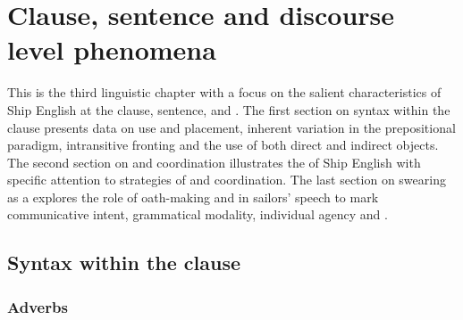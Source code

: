 \chapter{{Clause, sentence and discourse level phenomena}}

This is the third linguistic chapter with a focus on the salient characteristics of Ship English at the clause, sentence, and . The first section on syntax within the clause presents data on  use and placement, inherent variation in the prepositional paradigm, intransitive  fronting and the use of both direct and indirect objects. The second section on  and coordination illustrates the  of Ship English with specific attention to strategies of  and coordination. The last section on swearing as a  explores the role of oath-making and  in sailors’ speech to mark communicative intent, grammatical modality, individual agency and . 

\section{{Syntax within the clause}}%

\subsection{{Adverbs}}%

